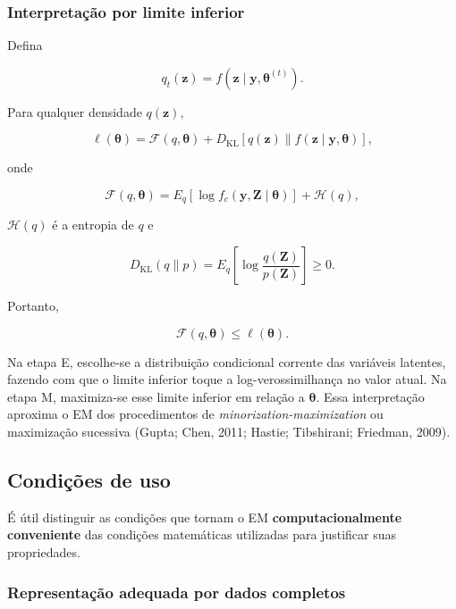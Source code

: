 \documentclass[
  letterpaper,
  DIV=11,
  numbers=noendperiod]{scrreprt}
\begin{document}
\subsubsection{Interpretação por limite
inferior}\label{interpretauxe7uxe3o-por-limite-inferior}

Defina

\[q_t(\boldsymbol{z})
=
f(\boldsymbol{z}\mid\boldsymbol{y},\boldsymbol{\theta}^{(t)}).\]

Para qualquer densidade \(q(\boldsymbol{z})\),

\[\ell(\boldsymbol{\theta})
=
\mathcal{F}(q,\boldsymbol{\theta})
+
D_{\mathrm{KL}}
\left[
q(\boldsymbol{z})
\parallel
f(\boldsymbol{z}\mid\boldsymbol{y},\boldsymbol{\theta})
\right],\]

onde

\[\mathcal{F}(q,\boldsymbol{\theta})
=
E_q\left[
\log f_c(\boldsymbol{y},\boldsymbol{Z}\mid\boldsymbol{\theta})
\right]
+
\mathcal{H}(q),\]

\(\mathcal{H}(q)\) é a entropia de \(q\) e

\[D_{\mathrm{KL}}(q\parallel p)
=
E_q\left[
\log\frac{q(\boldsymbol{Z})}{p(\boldsymbol{Z})}
\right]
\geq 0.\]

Portanto,

\[\mathcal{F}(q,\boldsymbol{\theta})
\leq
\ell(\boldsymbol{\theta}).\]

Na etapa E, escolhe-se a distribuição condicional corrente das variáveis
latentes, fazendo com que o limite inferior toque a log-verossimilhança
no valor atual. Na etapa M, maximiza-se esse limite inferior em relação
a \(\boldsymbol{\theta}\). Essa interpretação aproxima o EM dos
procedimentos de \emph{minorization-maximization} ou maximização
sucessiva (Gupta; Chen, 2011; Hastie; Tibshirani; Friedman, 2009).

\subsection{Condições de uso}\label{condiuxe7uxf5es-de-uso}

É útil distinguir as condições que tornam o EM
\textbf{computacionalmente conveniente} das condições matemáticas
utilizadas para justificar suas propriedades.

\subsubsection{Representação adequada por dados
completos}\label{representauxe7uxe3o-adequada-por-dados-completos}
\end{document}

